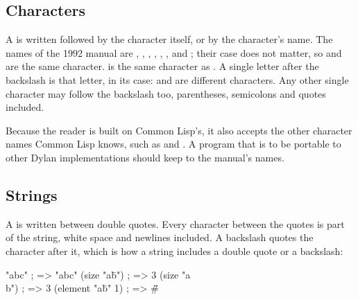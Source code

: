 \subsection{Characters}\label{sec:syntax-characters}

A  is written \code{\#\textbackslash} followed by the
character itself, or by the character's name. The names of the 1992 manual
are , , , , ,
,  and ; their case does not
matter, so  and 
are the same character.  is the same
character as . A single letter after the
backslash is that letter, in its case:  and
 are different characters. Any other single
character may follow the backslash too, parentheses, semicolons and quotes
included.


\noindent Because the reader is built on Common Lisp's, it also accepts the
other character names Common Lisp knows, such as  and . A program that is to be portable to
other Dylan implementations should keep to the manual's names.

\subsection{Strings}\label{sec:syntax-strings}

A  is written between double quotes. Every character between
the quotes is part of the string, white space and newlines included. A
backslash quotes the character after it, which is how a string includes a
double quote or a backslash:

\begin{dylan}
"abc"              ; => "abc"
(size "a\"b")      ; => 3
(size "a\\b")      ; => 3
(element "a\"b" 1) ; => #\"
\end{dylan}

